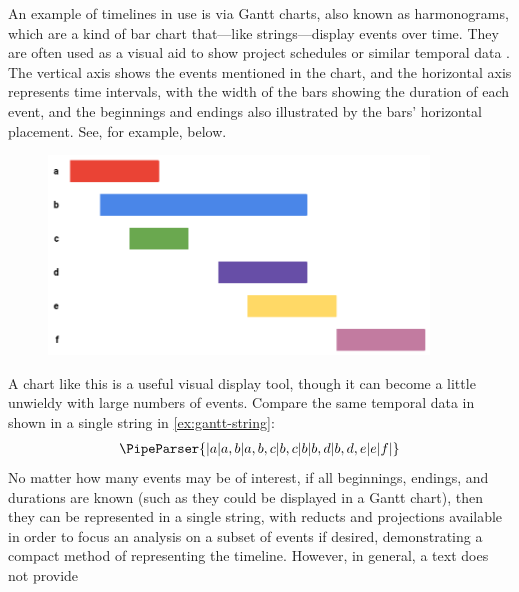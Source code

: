 \documentclass[a4paper,12pt,leqno]{article}
\newcommand{\vph}[1]{\vphantom{#1}}
\newcommand{\ebox}[1]{\fbox{$\vph{'(),}#1$}}
\newcommand{\EventString}[1]{%
	\renewcommand*{\do}[1]{\ebox{##1}}%
	\PipeParser{#1}%
}
\begin{document}
An example of timelines in use is via Gantt charts, also known as harmonograms, which are a kind of bar chart that---like strings---display events over time. They are often used as a visual aid to show project schedules or similar temporal data \citep{kumar2005effective}. %
The vertical axis shows the events mentioned in the chart, and the horizontal axis represents time intervals, with the width of the bars showing the duration of each event, and the beginnings and endings also illustrated by the bars' horizontal placement. See, for example,  below.

\begin{center}
	\begin{figure}[h!]
		\centering
		\includegraphics[width=0.9\textwidth]{images/gantt-chart-example.png}
		\label{ex:gantt-chart}
	\end{figure}
\end{center}

A chart like this is a useful visual display tool, though it can become a little unwieldy with large numbers of events. Compare the same temporal data in  shown in a single string in \cref{ex:gantt-string}:
\begin{align}\label{ex:gantt-string}
	\EventString{{}|a|a,b|a,b,c|b,c|b|b,d|b,d,e|e|f|{}}
\end{align}
No matter how many events may be of interest, if all beginnings, endings, and durations are known (such as they could be displayed in a Gantt chart), then they can be represented in a single string, with reducts and projections available in order to focus an analysis on a subset of events if desired, demonstrating a compact method of representing the timeline. However, in general, a text does not provide
\end{document}
